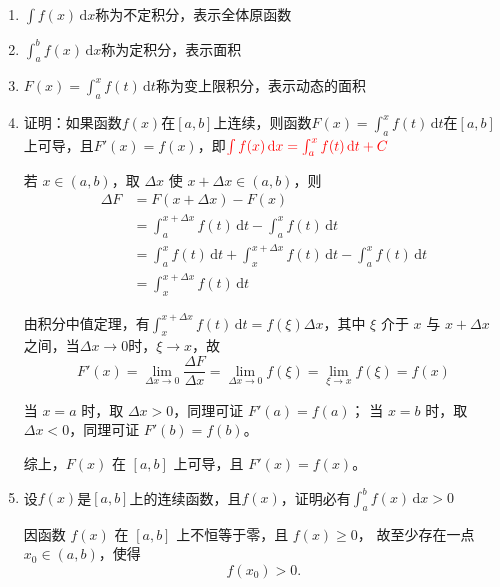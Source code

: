 \documentclass[a4paper,12pt]{article}
\begin{document}
    \begin{enumerate}
        \item $\int f(x)\,\mathrm{d}x$称为不定积分，表示全体原函数
        \item $\int_a^b f(x)\,\mathrm{d}x$称为定积分，表示面积
        \item $F(x) = \int_a^x f(t)\,\mathrm{d}t$称为变上限积分，表示动态的面积
        \item 证明：如果函数$f(x)$在$[a, b]$上连续，则函数$F(x) = \int_a^x f(t)\,\mathrm{d}t$在$[a, b]$上可导，且$F'(x) = f(x)$，即$\color{red}{\int f(x)\,\mathrm{d}x = \int_a^x f(t)\,\mathrm{d}t + C}$
        \begin{analysisbox}[证]
            若 $x\in(a,b)$，取 $\Delta x$ 使 $x+\Delta x\in(a,b)$，则
            \[
                \begin{aligned}
                    \Delta F
                    &= F(x+\Delta x)-F(x) \\
                    &= \int_a^{x+\Delta x} f(t)\,\mathrm{d}t - \int_a^{x} f(t)\,\mathrm{d}t \\
                    &= \int_a^{x} f(t)\,\mathrm{d}t + \int_x^{x+\Delta x} f(t)\,\mathrm{d}t - \int_a^{x} f(t)\,\mathrm{d}t \\
                    &= \int_x^{x+\Delta x} f(t)\,\mathrm{d}t
                \end{aligned}
            \]

            由积分中值定理，有$\int_x^{x + \Delta x} f(t)\,\mathrm{d}t = f(\xi)\Delta x$，其中 $\xi$ 介于 $x$ 与 $x+\Delta x$ 之间，当$\Delta x\to 0$时，$\xi \to x$，故
            \[
                F'(x) = \lim_{\Delta x\to 0}\frac{\Delta F}{\Delta x}  = \lim_{\Delta x\to 0} f(\xi) = \lim_{\xi\to x} f(\xi) = f(x)
            \]

            当 $x=a$ 时，取 $\Delta x>0$，同理可证 $F'(a)=f(a)$；
            当 $x=b$ 时，取 $\Delta x<0$，同理可证 $F'(b)=f(b)$。

            综上，$F(x)$ 在 $[a,b]$ 上可导，且 $F'(x)=f(x)$。
        \end{analysisbox}
        \item 设$f(x)$是$[a, b]$上{\color{red}{非负}}的连续函数，且$f(x)${\color{red}{不恒等于零}}，证明必有$\int_a^b f(x)\,\mathrm{d}x > 0$
        \begin{analysisbox}[证]
            因函数 $f(x)$ 在 $[a,b]$ 上不恒等于零，且 $f(x)\ge 0$，
            故至少存在一点 $x_0\in(a,b)$，使得
            \[
                f(x_0)>0.
            \]


\end{analysisbox}
\end{enumerate}
\end{document}
